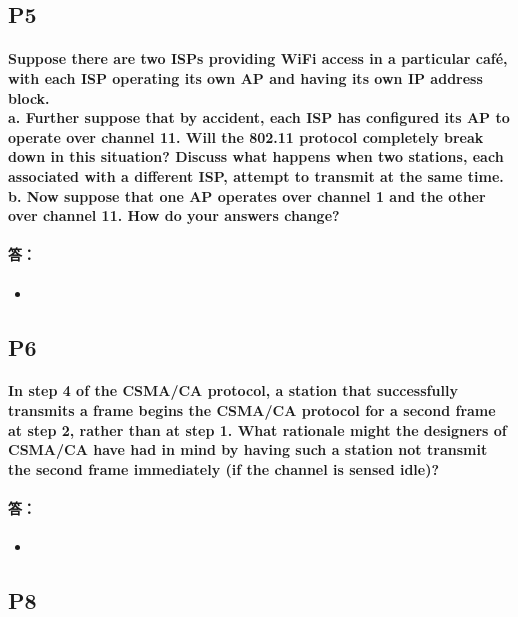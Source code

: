 \documentclass[a4paper]{ctexart}
\begin{document}
\subsection*{P5}
\paragraph*{Suppose there are two ISPs providing WiFi access in a particular café, with each ISP operating its own AP and having its own IP address block.\\
a. Further suppose that by accident, each ISP has configured its AP to operate over channel 11. Will the 802.11 protocol completely break down in this situation? Discuss what happens when two stations, each associated with a different ISP, attempt to transmit at the same time.\\
b. Now suppose that one AP operates over channel 1 and the other over channel 11. How do your answers change? \\}
\paragraph*{答：} 
\begin{itemize}
    \item 
\end{itemize}

\subsection*{P6}
\paragraph*{In step 4 of the CSMA/CA protocol, a station that successfully transmits a frame begins the CSMA/CA protocol for a second frame at step 2, rather than at step 1. What rationale might the designers of CSMA/CA have had in mind by having such a station not transmit the second frame immediately (if the
channel is sensed idle)?\\}
\paragraph*{答：} 
\begin{itemize}
    \item 
\end{itemize}

\subsection*{P8}
\end{document}
